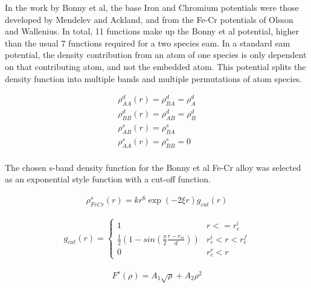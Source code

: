 In the work by Bonny et al, the base Iron and Chromium potentials were those developed by Mendelev and Ackland, and from the Fe-Cr potentials of Olsson and Wallenius.  In total, 11 functions make up the Bonny et al potential, higher than the usual 7 functions required for a two species \acrshort{eam}.  In a standard \acrshort{eam} potential, the density contribution from an atom of one species is only dependent on that contributing atom, and not the embedded atom.  This potential splits the density function into multiple bands and multiple permutations of atom species.

\begin{equation}
\begin{split}
\rho_{AA}^{d} (r) = \rho_{BA}^{d} = \rho_{A}^{d} \\
\rho_{BB}^{d} (r) = \rho_{AB}^{d} = \rho_{B}^{d} \\
\rho_{AB}^{s} (r) = \rho_{BA}^{s} \\
\rho_{AA}^{s} (r) = \rho_{BB}^{s} = 0 \\
\end{split}
\label{eq:densityfunctions}
\end{equation}

The chosen s-band density function for the Bonny et al Fe-Cr alloy was selected as an exponential style function with a cut-off function.

\begin{equation}
\begin{split}
\rho_{FeCr}^{s} (r) = k r^6 \exp(-2 \xi r) g_{cut} (r)
\end{split}
\label{eq:fecrsbanddensity}
\end{equation}

\begin{equation}
\begin{split}
g_{cut} (r) = \left\{ \begin{matrix} 1 & r <= r_c^i \\  \frac{1}{2}\left(1 - sin(\frac{\pi}{2} \frac{r-r_m}{d}) \right) & r_c^i < r < r_c^f \\ 0 & r_c^r < r \end{matrix} \right . 
\end{split}
\label{eq:fecrsbanddensitycutoff}
\end{equation}

\begin{equation}
\begin{split}
F^s(\rho) = A_1 \sqrt{\rho} + A_2 \rho^2
\end{split}
\label{eq:fecrsbandembedding}
\end{equation}

